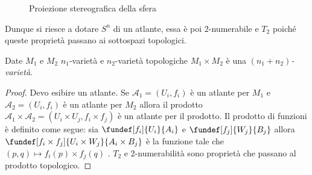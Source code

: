 \begin{figure}
    \centering %
    
    \caption{Proiezione stereografica della sfera}
\end{figure}

Dunque si riesce a dotare $S^{n}$ di un atlante, essa è poi 2-numerabile e $T_{2}$ poiché queste proprietà passano ai sottospazi topologici.


\begin{prop}
Date $M_{1}$ e $M_2$ $n_1$-varietà e $n_2$-varietà topologiche $M_1\times M_2$ è una \emph{$(n_1+n_2)$-varietà}.
\end{prop}
\begin{proof}
Devo esibire un atlante. Se $\mathcal{A}_{1} = {(U_i, f_i)}$ è un atlante per $M_1$ e $\mathcal{A}_{2} = {(U_i, f_i)}$ è un atlante per $M_2$ allora il prodotto $\mathcal{A}_{1} \times \mathcal{A}_{2} = {(U_i \times U_j, f_i \times f_j)}$ è un atlante per il prodotto. Il prodotto di funzioni è definito come segue: sia $\fundef[f_i]{U_i}{A_i}$ e $\fundef[f_j]{W_j}{B_j}$ allora $\fundef[f_i\times f_j]{U_{i} \times W_{j}}{A_{i} \times B_{j}}$ è la funzione tale che $(p, q) \mapsto f_i(p) \times f_j(q)$  .
$T_2$ e 2-numerabilità sono proprietà che passano al prodotto topologico.
\end{proof}

